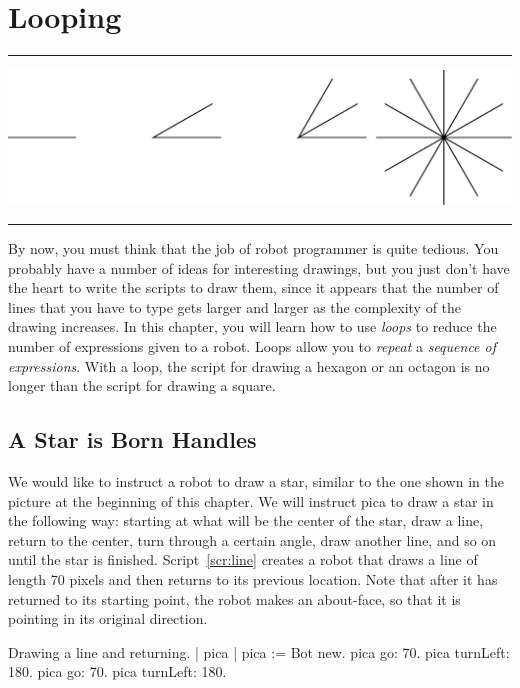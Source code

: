 \documentclass[a4paper,10pt,twoside]{book}
\begin{document}
    \sloppy
\fi

\chapter{Looping}\label{cha:looping}


\noindent\hrule
\begin{center}\includegraphics[width=\linewidth]{loopTitlePicture}\end{center}
\vspace{0.2cm}
\noindent\hrule\vspace{1.5cm}


By now, you must think that the job of robot programmer is quite tedious. You probably 
have a number of ideas for interesting drawings, but you just don’t have the heart to write 
the scripts to draw them, since it appears that the number of lines that you have to type gets 
larger and larger as the complexity of the drawing increases. In this chapter, you will learn how to use \emph{loops} to reduce the number of expressions given to a robot. Loops allow you to \emph{repeat} a \emph{sequence of expressions}. With a loop, the script for drawing a hexagon or an octagon is no longer than the script for drawing a square.


\section{A Star is Born Handles}
We would like to instruct a robot to draw a star, similar to the one shown in the picture at the beginning of this chapter. We will instruct pica to draw a star in the following way: starting at what will be the center of the star, draw a line, return to the center, turn through a certain angle, draw another line, and so on until the star is finished. Script~\ref{scr:line} creates a robot that draws a line of length 70 pixels and then returns to its previous location. Note that after it has returned to its starting point, the robot makes an about-face, so that it is pointing in its original direction. 

\begin{script}[line]{Drawing a line and returning.}
	| pica | 
	pica := Bot new. 
	pica go: 70. 
	pica turnLeft: 180. 
	pica go: 70. 
	pica turnLeft: 180.
\end{script}
\end{document}
